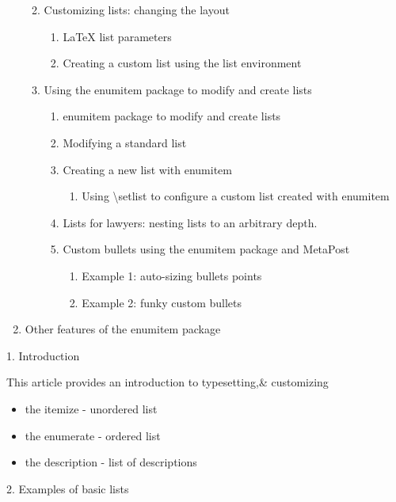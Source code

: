 \documentclass{book}
\begin{document}
\begin{enumerate}
\begin{enumerate}
\begin{enumerate}
\begin{enumerate}
            \end{enumerate}
    \end{enumerate}
    \item Customizing lists: changing the layout
          \begin{enumerate}
            \item LaTeX list parameters
            \item Creating a custom list using the list environment
          \end{enumerate}
    \item Using the enumitem package to modify and create lists
     \begin{enumerate}
        \item enumitem package to modify and create lists
        \item Modifying a standard list
        \item Creating a new list with enumitem
              \begin{enumerate}
              \item Using \textbackslash setlist to configure a custom list created with enumitem
              \end{enumerate}
        \item Lists for lawyers: nesting lists to an arbitrary depth.
        \item Custom bullets using the enumitem package and MetaPost
              \begin{enumerate}
                \item Example 1: auto-sizing bullets points 
                \item Example 2: funky custom bullets
              \end{enumerate}                      
\end{enumerate}         
    
    
   \end{enumerate}         
\item Other features of the enumitem package
\end{enumerate}

\vspace{10ex}

\noindent
\huge 1. Introduction

  \normalsize \setlength{\parindent}{0.5in}This article provides an introduction to typesetting,\& customizing
  
 \begin{itemize}
  \item the itemize - unordered list 
  \item the enumerate - ordered list
  \item the description - list of descriptions 
\end{itemize}  
\noindent
\huge 2. Examples of basic lists
\end{document}
